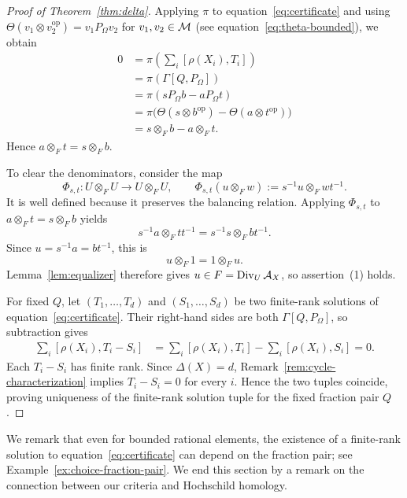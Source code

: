 \begin{proof}[Proof of Theorem~\ref{thm:delta}]
Applying $\pi$ to equation~\eqref{eq:certificate} and using $\Theta(v_1\otimes v_2^{\mathrm{op}})=v_1P_\Omega v_2$ for $v_1,v_2\in\mathcal M$ (see equation~\eqref{eq:theta-bounded}), we obtain
\begin{align*}
 0&=\pi\left(\sum_i[\rho(X_i),T_i]\right)\\
  &=\pi(\Gamma[Q,P_\Omega])\\
  &=\pi(sP_\Omega b-aP_\Omega t)\\
  &=\pi\bigl(\Theta(s\otimes b^{\mathrm{op}})-\Theta(a\otimes t^{\mathrm{op}})\bigr)\\
  &=s\otimes_Fb-a\otimes_Ft.
\end{align*}
Hence $a\otimes_Ft=s\otimes_Fb$.

To clear the denominators, consider the map
\[
 \Phi_{s,t}:U\otimes_FU\longrightarrow U\otimes_FU,\qquad
 \Phi_{s,t}(u\otimes_Fw):=s^{-1}u\otimes_Fwt^{-1}.
\]
It is well defined because it preserves the balancing relation.
Applying $\Phi_{s,t}$ to $a\otimes_Ft=s\otimes_Fb$ yields
\[
 s^{-1}a\otimes_Ftt^{-1}=s^{-1}s\otimes_Fbt^{-1}.
\]
Since $u=s^{-1}a=bt^{-1}$, this is
\[
 u\otimes_F1=1\otimes_Fu.
\]
Lemma~\ref{lem:equalizer} therefore gives $u\in F=\operatorname{Div}_U\mathcal A_X$, so assertion~\textup{(1)} holds.

For fixed $Q$, let $(T_1,\ldots,T_d)$ and $(S_1,\ldots,S_d)$ be two finite-rank solutions of equation~\eqref{eq:certificate}.
Their right-hand sides are both $\Gamma[Q,P_\Omega]$, so subtraction gives
\begin{align*}
 \sum_i[\rho(X_i),T_i-S_i]
 &=\sum_i[\rho(X_i),T_i]-\sum_i[\rho(X_i),S_i]=0.
\end{align*}
Each $T_i-S_i$ has finite rank.
Since $\Delta(X)=d$, Remark~\ref{rem:cycle-characterization} implies $T_i-S_i=0$ for every $i$.
Hence the two tuples coincide, proving uniqueness of the finite-rank solution tuple for the fixed fraction pair $Q$.

\end{proof}

We remark that even for bounded rational elements, the existence of a finite-rank solution to equation~\eqref{eq:certificate} can depend on the fraction pair; see Example~\ref{ex:choice-fraction-pair}.
We end this section by a remark on the connection between our criteria and Hochschild homology.

